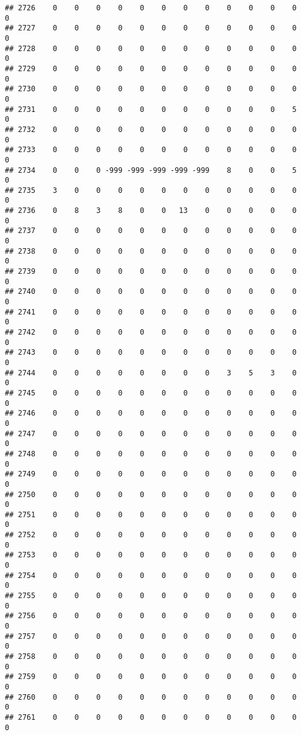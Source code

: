 \documentclass[]{article}
\begin{document}
\begin{verbatim}
## 2726    0    0    0    0    0    0    0    0    0    0    0    0    0
## 2727    0    0    0    0    0    0    0    0    0    0    0    0    0
## 2728    0    0    0    0    0    0    0    0    0    0    0    0    0
## 2729    0    0    0    0    0    0    0    0    0    0    0    0    0
## 2730    0    0    0    0    0    0    0    0    0    0    0    0    0
## 2731    0    0    0    0    0    0    0    0    0    0    0    5    0
## 2732    0    0    0    0    0    0    0    0    0    0    0    0    0
## 2733    0    0    0    0    0    0    0    0    0    0    0    0    0
## 2734    0    0    0 -999 -999 -999 -999 -999    8    0    0    5    0
## 2735    3    0    0    0    0    0    0    0    0    0    0    0    0
## 2736    0    8    3    8    0    0   13    0    0    0    0    0    0
## 2737    0    0    0    0    0    0    0    0    0    0    0    0    0
## 2738    0    0    0    0    0    0    0    0    0    0    0    0    0
## 2739    0    0    0    0    0    0    0    0    0    0    0    0    0
## 2740    0    0    0    0    0    0    0    0    0    0    0    0    0
## 2741    0    0    0    0    0    0    0    0    0    0    0    0    0
## 2742    0    0    0    0    0    0    0    0    0    0    0    0    0
## 2743    0    0    0    0    0    0    0    0    0    0    0    0    0
## 2744    0    0    0    0    0    0    0    0    3    5    3    0    0
## 2745    0    0    0    0    0    0    0    0    0    0    0    0    0
## 2746    0    0    0    0    0    0    0    0    0    0    0    0    0
## 2747    0    0    0    0    0    0    0    0    0    0    0    0    0
## 2748    0    0    0    0    0    0    0    0    0    0    0    0    0
## 2749    0    0    0    0    0    0    0    0    0    0    0    0    0
## 2750    0    0    0    0    0    0    0    0    0    0    0    0    0
## 2751    0    0    0    0    0    0    0    0    0    0    0    0    0
## 2752    0    0    0    0    0    0    0    0    0    0    0    0    0
## 2753    0    0    0    0    0    0    0    0    0    0    0    0    0
## 2754    0    0    0    0    0    0    0    0    0    0    0    0    0
## 2755    0    0    0    0    0    0    0    0    0    0    0    0    0
## 2756    0    0    0    0    0    0    0    0    0    0    0    0    0
## 2757    0    0    0    0    0    0    0    0    0    0    0    0    0
## 2758    0    0    0    0    0    0    0    0    0    0    0    0    0
## 2759    0    0    0    0    0    0    0    0    0    0    0    0    0
## 2760    0    0    0    0    0    0    0    0    0    0    0    0    0
## 2761    0    0    0    0    0    0    0    0    0    0    0    0    0

\end{verbatim}
\end{document}
